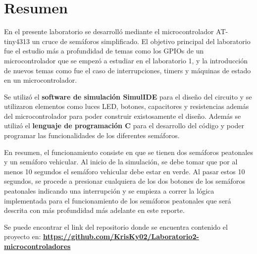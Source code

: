 \section{Resumen}

En el presente laboratorio se desarrolló mediante el microcontrolador AT-tiny4313 un cruce de semáforos simplificado. El objetivo principal del laboratorio fue el estudio más a profundidad de temas como los GPIOs de un microcontrolador que se empezó a estudiar en el laboratorio 1, y la introducción de nuevos temas como fue el caso de interrupciones, timers y máquinas de estado en un microcontrolador.

Se utilizó el \textbf{software de simulación SimulIDE} para el diseño del circuito y se utilizaron elementos como luces LED, botones, capacitores y resistencias además del microcontrolador para poder construir existosamente el diseño. Además se utilizó el \textbf{lenguaje de programación C} para el desarrollo del código y poder programar las funcionalidades de los diferentes semáforos.

En resumen, el funcionamiento consiste en que se tienen dos semáforos peatonales y un semáforo vehicular. Al inicio de la simulación, se debe tomar que por al menos 10 segundos el semáforo vehicular debe estar en verde. Al pasar estos 10 segundos, se procede a presionar cualquiera de los dos botones de los semáforos peatonales indicando una interrupción y se empieza a correr la lógica implementada para el funcionamiento de los semáforos peatonales que será descrita con más profundidad más adelante en este reporte. 

Se puede encontrar el link del repositorio donde se encuentra contenido el proyecto en:
\textbf{\url{https://github.com/KrisKy02/Laboratorio2-microcontroladores}}